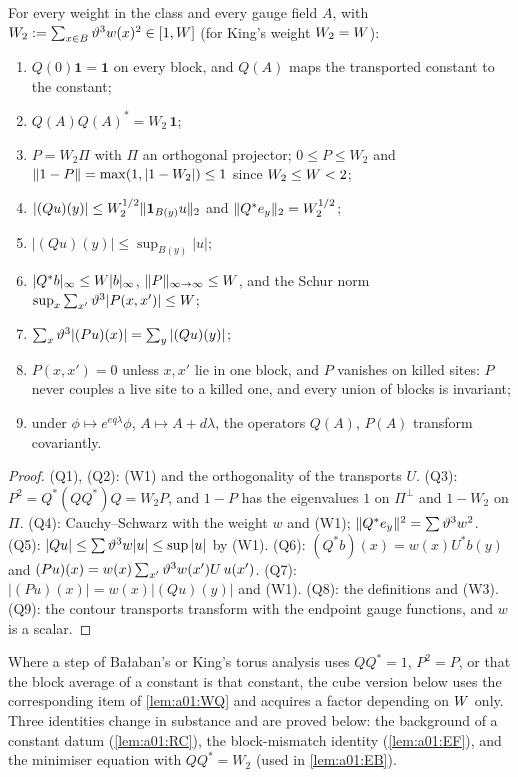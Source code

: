 \begin{lemma}\label{lem:a01:WQ}
For every weight in the class and every gauge field $A$, with $W_2:=\sum_{x\in B}\vartheta^3w(x)^2\in[1,W]$ (for King's weight $W_2=W$):
\begin{enumerate}[label=(Q\arabic*),nosep]
\item $Q(0)\mathbf 1=\mathbf 1$ on every block, and $Q(A)$ maps the transported constant to the constant;
\item $Q(A)Q(A)^*=W_2\,\mathbf 1$;
\item $P=W_2\Pi$ with $\Pi$ an orthogonal projector; $0\le P\le W_2$ and $\lVert 1-P\rVert=\max(1,|1-W_2|)\le1$ since $W_2\le W<2$;
\item $|(Qu)(y)|\le W_2^{1/2}\lVert \mathbf 1_{B(y)}u\rVert_2$ and $\lVert Q^*e_y\rVert_2=W_2^{1/2}$;
\item $|(Qu)(y)|\le\sup_{B(y)}|u|$;
\item $|Q^*b|_\infty\le W|b|_\infty$, $\lVert P\rVert_{\infty\to\infty}\le W$, and the Schur norm $\sup_x\sum_{x'}\vartheta^3|P(x,x')|\le W$;
\item $\sum_x\vartheta^3|(Pu)(x)|=\sum_y|(Qu)(y)|$;
\item $P(x,x')=0$ unless $x,x'$ lie in one block, and $P$ vanishes on killed sites: $P$ never couples a live site to a killed one, and every union of blocks is invariant;
\item under $\phi\mapsto e^{eq\lambda}\phi$, $A\mapsto A+d\lambda$, the operators $Q(A)$, $P(A)$ transform covariantly.
\end{enumerate}
\end{lemma}
\begin{proof}
(Q1), (Q2): (W1) and the orthogonality of the transports $U$. (Q3): $P^2=Q^*(QQ^*)Q=W_2P$, and $1-P$ has the eigenvalues $1$ on $\Pi^\perp$ and $1-W_2$ on $\Pi$. (Q4): Cauchy--Schwarz with the weight $w$ and (W1); $\lVert Q^*e_y\rVert^2=\sum\vartheta^3w^2$. (Q5): $|Qu|\le\sum\vartheta^3w|u|\le\sup|u|$ by (W1). (Q6): $(Q^*b)(x)=w(x)U^*b(y)$ and $(Pu)(x)=w(x)\sum_{x'}\vartheta^3w(x')U\,u(x')$. (Q7): $|(Pu)(x)|=w(x)|(Qu)(y)|$ and (W1). (Q8): the definitions and (W3). (Q9): the contour transports transform with the endpoint gauge functions, and $w$ is a scalar.
\end{proof}

Where a step of Ba{\l}aban's or King's torus analysis uses $QQ^*=1$, $P^2=P$, or that the block average of a constant is that constant, the cube version below uses the corresponding item of \cref{lem:a01:WQ} and acquires a factor depending on $W$ only. Three identities change in substance and are proved below: the background of a constant datum (\cref{lem:a01:RC}), the block-mismatch identity (\cref{lem:a01:EF}), and the minimiser equation with $QQ^*=W_2$ (used in \cref{lem:a01:EB}).

